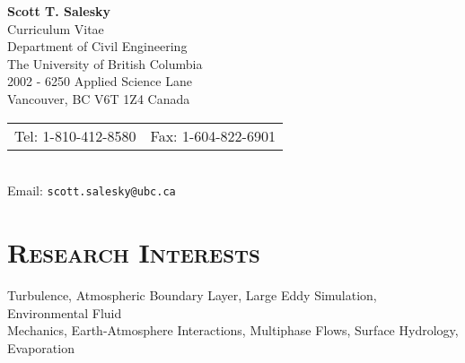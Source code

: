\documentclass[11pt,letterpaper]{article}
\begin{document}

\pagestyle{empty}           %
\pagestyle{fancy}
\fancyfoot{}                        %
\fancyhead{}                        %
\renewcommand{\headrulewidth}{0pt}

\begin{center}
    \textbf{\Large Scott T. Salesky} \\
    {\Large{Curriculum Vitae}} \\ \smallskip
    Department of Civil Engineering \\
    The University of British Columbia \\
    2002 - 6250 Applied Science Lane \\
    Vancouver, BC V6T 1Z4 Canada \\
    \begin{tabular}{c c}
        Tel: 1-810-412-8580 & Fax: 1-604-822-6901
    \end{tabular} \\
    Email: \texttt{scott.salesky@ubc.ca}
\end{center}

\section*{\textsc{Research Interests}} 

Turbulence, Atmospheric Boundary Layer, Large Eddy Simulation, Environmental Fluid \\ Mechanics,
Earth-Atmosphere Interactions, Multiphase Flows, Surface Hydrology, Evaporation 

\end{document}

